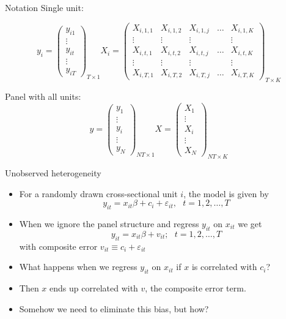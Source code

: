 \documentclass{beamer}
\begin{document}
\begin{frame}{Notation}
Single unit:

\[ y_i = \left( \begin{array}{c}
y_{i1} \\
\vdots \\
y_{it} \\
\vdots \\
y_{iT}
\end{array} \right)_{T\times 1}
%
X_i = \left( \begin{array}{ccccc}
X_{i,1,1} & X_{i,1,2} & X_{i,1,j} & \dots & X_{i,1,K} \\
\vdots & \vdots & \vdots & & \vdots \\
X_{i,t,1} & X_{i,t,2} & X_{i,t,j} & \dots & X_{i,t,K} \\
\vdots & \vdots & \vdots & & \vdots \\
X_{i,T,1} & X_{i,T,2} & X_{i,T,j} & \dots & X_{i,T,K} 
\end{array} \right)_{T\times K}
\]

Panel with all units:
\[ y = \left( \begin{array}{c}
y_{1} \\
\vdots \\
y_{i} \\
\vdots \\
y_{N}
\end{array} \right)_{NT\times 1}
%
X = \left( \begin{array}{c}
X_1  \\
\vdots \\
X_i \\
\vdots \\
X_N
\end{array} \right)_{NT \times K}
\]


\end{frame}

\begin{frame}{Unobserved heterogeneity}

	
	\begin{itemize}
	\item For a randomly drawn cross-sectional unit $i$, the model is given by $$y_{it} = x_{it}\beta + c_i + \varepsilon_{it}, \text{   }t=1,2,\dots,T$$
	\item When we ignore the panel structure and regress $y_{it}$ on $x_{it}$ we get$$ y_{it}=x_{it}\beta + v_{it}; \text{    }t=1,2,\dots,T$$with composite error $v_{it} \equiv c_i + \varepsilon_{it}$
	\item What happens when we regress $y_{it}$ on $x_{it}$ if $x$ is correlated with $c_i$?
	\item Then $x$ ends up correlated with $v$, the composite error term.
	\item Somehow we need to eliminate this bias, but how?
	\end{itemize}
\end{frame}
\end{document}
